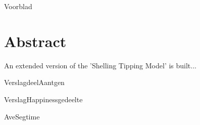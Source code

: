 \documentclass{article}
\begin{document}
{Voorblad}
\newpage

\section*{Abstract}
An extended version of the 'Shelling Tipping Model' is built...
\newpage

\tableofcontents
\newpage


\newpage


\newpage

{VerslagdeelAantgen}
\newpage

{VerslagHappinessgedeelte}
\newpage

{AveSegtime}
\newpage
\end{document}
